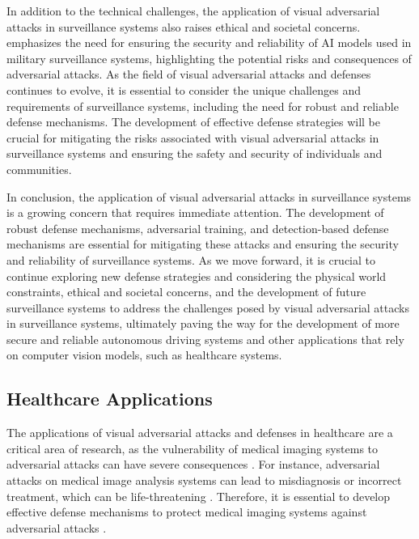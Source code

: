 \documentclass[11pt]{article}
\begin{document}
In addition to the technical challenges, the application of visual adversarial attacks in surveillance systems also raises ethical and societal concerns. \cite{ref120} emphasizes the need for ensuring the security and reliability of AI models used in military surveillance systems, highlighting the potential risks and consequences of adversarial attacks. As the field of visual adversarial attacks and defenses continues to evolve, it is essential to consider the unique challenges and requirements of surveillance systems, including the need for robust and reliable defense mechanisms. The development of effective defense strategies will be crucial for mitigating the risks associated with visual adversarial attacks in surveillance systems and ensuring the safety and security of individuals and communities.

In conclusion, the application of visual adversarial attacks in surveillance systems is a growing concern that requires immediate attention. The development of robust defense mechanisms, adversarial training, and detection-based defense mechanisms are essential for mitigating these attacks and ensuring the security and reliability of surveillance systems. As we move forward, it is crucial to continue exploring new defense strategies and considering the physical world constraints, ethical and societal concerns, and the development of future surveillance systems to address the challenges posed by visual adversarial attacks in surveillance systems, ultimately paving the way for the development of more secure and reliable autonomous driving systems and other applications that rely on computer vision models, such as healthcare systems.

\subsection{Healthcare Applications}

The applications of visual adversarial attacks and defenses in healthcare are a critical area of research, as the vulnerability of medical imaging systems to adversarial attacks can have severe consequences \cite{ref121}. For instance, adversarial attacks on medical image analysis systems can lead to misdiagnosis or incorrect treatment, which can be life-threatening \cite{ref17}. Therefore, it is essential to develop effective defense mechanisms to protect medical imaging systems against adversarial attacks \cite{ref122}.
\end{document}

